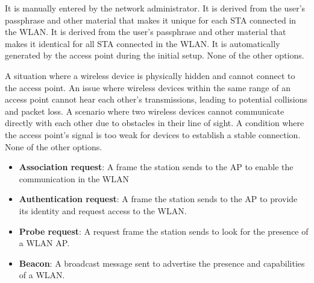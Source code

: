 \begin{checkboxes}
    \choice It is manually entered by the network administrator.
    \CorrectChoice It is derived from the user's passphrase and other material that makes it unique for each STA connected in the WLAN.
    \choice It is derived from the user's passphrase and other material that makes it identical for all STA connected in the WLAN.
    \choice It is automatically generated by the access point during the initial setup.
    \choice None of the other options.
\end{checkboxes}

\begin{checkboxes}
    \choice A situation where a wireless device is physically hidden and cannot connect to the access point.
    \CorrectChoice An issue where wireless devices within the same range of an access point cannot hear each other's transmissions, leading to potential collisions and packet loss.
    \choice A scenario where two wireless devices cannot communicate directly with each other due to obstacles in their line of sight.
    \choice A condition where the access point's signal is too weak for devices to establish a stable connection.
    \choice None of the other options.
\end{checkboxes}

\begin{solution}
    \begin{itemize}
        \item \textbf{Association request}: A frame the station sends to the AP to enable the communication in the WLAN
        \item \textbf{Authentication request}: A frame the station sends to the AP to provide its identity and request access to the WLAN.
        \item \textbf{Probe request}: A request frame the station sends to look for the presence of a WLAN AP.
        \item \textbf{Beacon}: A broadcast message sent to advertise the presence and capabilities of a WLAN.
    \end{itemize}
\end{solution}

